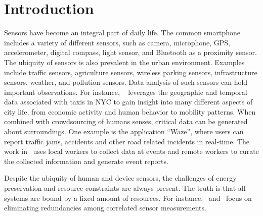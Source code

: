 \documentclass{acm_proc_article-sp}
\begin{document}
\section{Introduction}
Sensors have become an integral part of daily life. The common smartphone includes a variety of different sensors, such as camera, microphone, GPS, accelerometer, digital compass, light sensor, and Bluetooth as a proximity sensor. The ubiquity of sensors is also prevalent in the urban environment. Examples include traffic sensors, agriculture sensors, wireless parking sensors, infrastructure sensors, weather, and pollution sensors. Data analysis of such sensors can hold important observations. For instance, ~\cite{ferreira2013visual} leverages the geographic and temporal data associated with taxis in NYC to gain insight into many different aspects of city life, from economic activity and human behavior to mobility patterns. When combined with crowdsourcing of humans senses, critical data can be generated about surroundings. One example is the application ``Waze'', where users can report traffic jams, accidents and other road related incidents in real-time. The work in~\cite{agapie2015crowdsourcing} uses local workers to collect data at events and remote workers to curate the collected information and generate event reports.\par

Despite the ubiquity of human and device sensors, the challenges of energy preservation and resource constraints are always present. The truth is that all systems are bound by a fixed amount of resources. For instance,~\cite{marco2003many} and~\cite{pattem2008impact} focus on eliminating redundancies among correlated sensor measurements. \par
\end{document}
